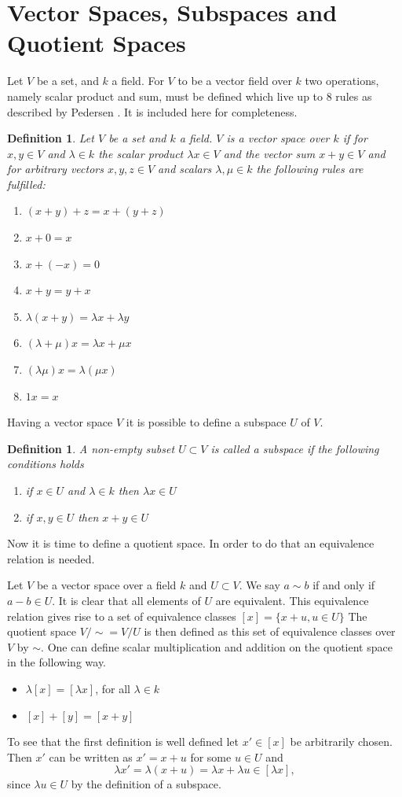 \documentclass[11pt,a4paper,twoside, openright]{report}
\newtheorem{mydef}[mythm]{Definition}
\begin{document}
\section{Vector Spaces, Subspaces and Quotient Spaces}
Let $V$ be a set, and $k$ a field. For $V$ to be a vector field over $k$ two operations, namely scalar product and sum, must be defined which live up to 8 rules as described by Pedersen \cite[pp. 85-86]{LinAlg}. It is included here for completeness.
\begin{mydef} 
Let $V$ be a set and $k$ a field. $V$ is a vector space over $k$ if for $x,y\in V$ and $\lambda\in k$ the scalar product $\lambda x\in V$ and the vector sum $x+y\in V$ and for arbitrary vectors $x,y,z\in V$ and scalars $\lambda,\mu\in k$ the following rules are fulfilled:
\begin{enumerate}
\item $(x+y)+z = x+(y+z)$
\item $x+0=x$
\item $x+(-x)=0$
\item $x+y=y+x$
\item $\lambda(x+y)=\lambda x+\lambda y$
\item $(\lambda+\mu)x=\lambda x + \mu x$
\item $(\lambda\mu)x=\lambda(\mu x)$
\item $1x=x$
\end{enumerate}
\end{mydef}
Having a vector space $V$ it is possible to define a subspace $U$ of $V$.\cite[p.93]{LinAlg}
\begin{mydef}
A non-empty subset $U\subset V$ is called a subspace if the following conditions holds
\begin{enumerate}
\item if $x\in U$ and $\lambda\in k$ then $\lambda x\in U$
\item if $x,y\in U$ then $x+y\in U$
\end{enumerate} 
\end{mydef}
Now it is time to define a quotient space. In order to do that an equivalence relation is needed. 

Let $V$ be a vector space over a field $k$ and $U\subset V$. We say $a\sim b$ if and only if $a-b\in U$. It is clear that all elements of $U$ are equivalent.
This equivalence relation gives rise to a set of equivalence classes $[x]=\{x+u,u\in U\}$
The quotient space $V/\sim = V/U$ is then defined as this set of equivalence classes over $V$ by $\sim$.
One can define scalar multiplication and addition on the quotient space in the following way. \cite{wikiQuo}
\begin{itemize}
\item $\lambda[x]=[\lambda x]$, for all $\lambda\in k$
\item $[x]+[y]=[x+y]$
\end{itemize}
To see that the first definition is well defined let $x'\in[x]$ be arbitrarily chosen. Then $x'$ can be written as $x'=x+u$ for some $u\in U$ and 
\begin{equation*}
\lambda x' = \lambda (x + u) = \lambda x + \lambda u \in [\lambda x],
\end{equation*}
since $\lambda u \in U$ by the definition of a subspace.
\end{document}
